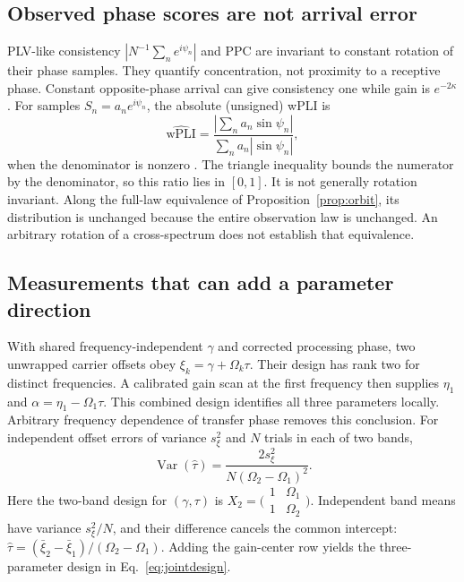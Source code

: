 \documentclass[submission,nolinenumbers]{esj}
\begin{document}
\subsection{Observed phase scores are not arrival error}\label{sec:measures}
PLV-like consistency $|N^{-1}\sum_n e^{i\psi_n}|$ and PPC are invariant to constant rotation of their phase samples. They quantify concentration, not proximity to a receptive phase. Constant opposite-phase arrival can give consistency one while gain is $e^{-2\kappa}$.
For samples $S_n=a_n e^{i\psi_n}$, the absolute (unsigned) wPLI is
\begin{equation}
\widehat{\mathrm{wPLI}}=\frac{|\sum_n a_n\sin\psi_n|}{\sum_n a_n|\sin\psi_n|},\label{eq:wpli}
\end{equation}
when the denominator is nonzero \citep{vinck2011}. The triangle inequality bounds the numerator by the denominator, so this ratio lies in $[0,1]$. It is not generally rotation invariant. Along the full-law equivalence of Proposition~\ref{prop:orbit}, its distribution is unchanged because the entire observation law is unchanged. An arbitrary rotation of a cross-spectrum does not establish that equivalence.

\subsection{Measurements that can add a parameter direction}\label{sec:constructive}
With shared frequency-independent $\gamma$ and corrected processing phase, two unwrapped carrier offsets obey $\xi_k=\gamma+\Omega_k\tau$. Their design has rank two for distinct frequencies. A calibrated gain scan at the first frequency then supplies $\eta_1$ and $\alpha=\eta_1-\Omega_1\tau$. This combined design identifies all three parameters locally. Arbitrary frequency dependence of transfer phase removes this conclusion.
For independent offset errors of variance $s_\xi^2$ and $N$ trials in each of two bands,
\begin{equation}
\operatorname{Var}(\widehat\tau)=\frac{2s_\xi^2}{N(\Omega_2-\Omega_1)^2}.
\label{eq:delayvariance}
\end{equation}
Here the two-band design for $(\gamma,\tau)$ is $X_2=\bigl(\begin{smallmatrix}1&\Omega_1\\1&\Omega_2\end{smallmatrix}\bigr)$. Independent band means have variance $s_\xi^2/N$, and their difference cancels the common intercept: $\widehat\tau=(\bar\xi_2-\bar\xi_1)/(\Omega_2-\Omega_1)$. Adding the gain-center row yields the three-parameter design in Eq.~\eqref{eq:jointdesign}.
\end{document}
